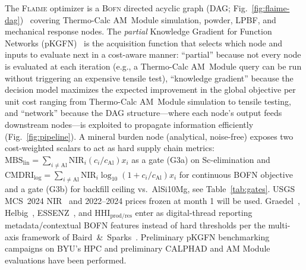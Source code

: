 \documentclass[11pt,letterpaper]{article}
\newcommand{\flaime}{\textsc{Flaime}}
\newcommand{\bofn}{\textsc{Bofn}}
\begin{document}
The \flaime{} optimizer is a \bofn{} directed acyclic graph
(DAG; Fig.~\ref{fig:flaime-dag})~\cite{sundar_2025_s4357802,paramore_2025_jactamat} covering
Thermo-Calc AM~Module simulation, powder, LPBF, and mechanical response nodes.
The \emph{partial} Knowledge Gradient for Function
Networks (pKGFN)~\cite{buathong_2023_23110214,buathong_2025_25061145}
is the acquisition function that selects which node and inputs to
evaluate next in a cost-aware manner: ``partial'' because not every
node is evaluated at each iteration (e.g., a Thermo-Calc AM~Module
query can be run without triggering an expensive tensile test),
``knowledge gradient'' because the decision model maximizes the expected
improvement in the global objective per unit cost
ranging from Thermo-Calc AM~Module simulation to tensile testing, and
``network'' because the DAG structure---where each node's output feeds downstream nodes---is exploited to propagate information efficiently (Fig.~\ref{fig:pipeline}).
A mineral burden node (analytical, noise-free) exposes two cost-weighted
scalars to act as hard supply chain metrics: $\mathrm{MBS}_{\text{lin}}{=}\sum_{i\neq\mathrm{Al}}\mathrm{NIR}_i(c_i/c_{\mathrm{Al}})x_i$
as a gate (G3a) on Sc-elimination and $\mathrm{CMDRI}_{\text{log}}{=}\sum_{i\neq\mathrm{Al}}\mathrm{NIR}_i\log_{10}(1+c_i/c_{\mathrm{Al}})x_i$
for continuous BOFN objective and a gate (G3b) for backfill ceiling vs.\ AlSi10Mg, see
Table~\ref{tab:gates}. USGS MCS~2024 NIR~\cite{usgs_mcs_2024}
and 2022--2024 prices frozen at month 1
will be used. Graedel~\cite{graedel_2012_es203534}, Helbig~\cite{mulukutla_2024_ssrn4968},
ESSENZ~\cite{cimprich_2019_jiec1286}, and $\mathrm{HHI}_{\text{prod/res}}$
enter as digital-thread reporting metadata/contextual BOFN features instead of hard thresholds %
per the multi-axis framework of Baird~\&~Sparks~\cite{titirici_2022_roadmap}. Preliminary pKGFN benchmarking campaigns on BYU's HPC and preliminary CALPHAD and AM Module evaluations have been performed.
\end{document}
